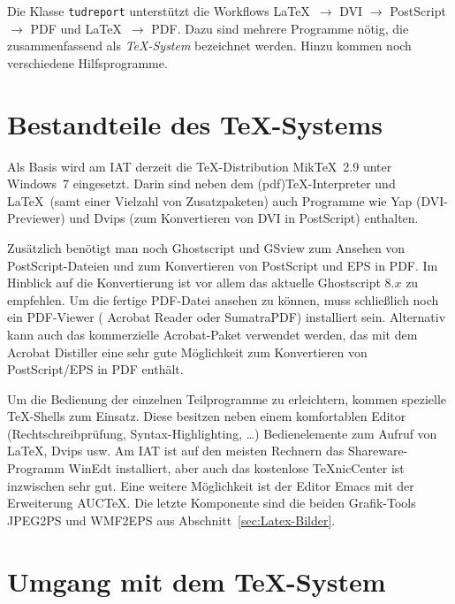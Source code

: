 Die Klasse \verb|tudreport| unterstützt die Workflows \LaTeX\ $\rightarrow$ DVI
$\rightarrow$ PostScript $\rightarrow$ PDF und \LaTeX\ $\rightarrow$ PDF. Dazu
sind mehrere Programme nötig, die zusammenfassend als \emph{\TeX-System}
bezeichnet werden. Hinzu kommen noch verschiedene Hilfsprogramme.


\section*{Bestandteile des \TeX-Systems}

Als Basis wird am IAT derzeit die \TeX-Distribution Mik\TeX\ 2.9 unter
Windows~7 eingesetzt. Darin sind neben dem
(pdf)\TeX-Interpreter und \LaTeX\ (samt einer Vielzahl von Zusatzpaketen) auch
Programme wie Yap (DVI-Previewer) und Dvips (zum Konvertieren von DVI in
PostScript) enthalten.

Zusätzlich benötigt man noch Ghostscript und GSview zum Ansehen von
PostScript-Dateien und zum Konvertieren von PostScript und EPS in PDF. Im
Hinblick auf die Konvertierung ist vor allem das aktuelle Ghostscript 8.$x$ zu
empfehlen. Um die fertige PDF-Datei ansehen zu können, muss schließlich noch ein PDF-Viewer (\zB
Acrobat Reader oder SumatraPDF) installiert sein. Alternativ kann auch das kommerzielle
Acrobat-Paket verwendet werden, das mit dem Acrobat Distiller eine sehr gute
Möglichkeit zum Konvertieren von PostScript/EPS in PDF enthält.

Um die Bedienung der einzelnen Teilprogramme zu erleichtern, kommen spezielle
\TeX-Shells zum Einsatz. Diese besitzen neben einem komfortablen Editor
(Rechtschreibprüfung, Syntax-Highlighting, \ldots) Bedienelemente zum Aufruf von
\LaTeX, Dvips usw. Am IAT ist auf den meisten Rechnern das Shareware-Programm
WinEdt installiert, aber auch das kostenlose \TeX{}nicCenter ist inzwischen sehr
gut. Eine weitere Möglichkeit ist der Editor Emacs mit der Erweiterung AUC\TeX.
Die letzte Komponente sind die beiden Grafik-Tools JPEG2PS und WMF2EPS aus
Abschnitt~\ref{sec:Latex-Bilder}.

\section*{Umgang mit dem \TeX-System}

